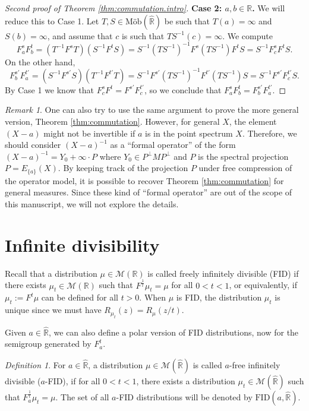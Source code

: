 \documentclass[reqno,11pt]{amsart}
\theoremstyle{remark}
\newtheorem{remark}[theorem]{Remark}
\newtheorem{definition}[theorem]{Definition}
\newcommand{\rr}{\mathbb{R}}
\newcommand{\MM}{\mathcal{M}}
\newcommand{\freepower}[1]{F^{#1}}
\newcommand{\pfreepower}[2]{F_{#1}^{#2}}
\newcommand{\mobr}{\text{Möb}(\hat{\rr})}
\begin{document}
\begin{proof}[Second proof of Theorem \ref{thm:commutation.intro}]
\textbf{Case 2: $a,b\in \rr$.} We will reduce this to Case 1. Let $T,S\in\mobr$ be such that $T(a)=\infty$ and $S(b)=\infty$, and assume that $c$ is such that $ TS^{-1} (c)=\infty$.  We compute
$$ \pfreepower{a}{s} \pfreepower{b}{t}= (T^{-1} \freepower{s} T )(S^{-1} \freepower{t}S) = S^{-1} (TS^{-1})^{-1} \freepower{s} (TS^{-1})\freepower{t} S= S^{-1} \pfreepower{c}{s}\freepower{t}S. $$
On the other hand,
$$\pfreepower{b}{s'}\pfreepower{a}{t'}=(S^{-1}\freepower{s'}S)(T^{-1} \freepower{t'} T )=S^{-1}\freepower{s'}(TS^{-1})^{-1} \freepower{t'} (TS^{-1})S= S^{-1} \freepower{s'}\pfreepower{c}{t'}S.$$
By Case 1 we know that $\pfreepower{c}{s}\freepower{t}=\freepower{s'}\pfreepower{c}{t'}$, so we conclude that $ \pfreepower{a}{s} \pfreepower{b}{t}= \pfreepower{b}{s'}\pfreepower{a}{t'}$.
\end{proof}

\begin{remark}
    One can also try to use the same argument to prove the more general version, Theorem \ref{thm:commutation}. However, for general $X$, the element $(X-a)$ might not be invertible if $a$ is in the point spectrum $X$. Therefore, we should consider $ (X-a)^{-1} $ as a ``formal operator'' of the form $(X-a)^{-1}= Y_0+\infty\cdot P$ where $Y_0 \in P^\perp MP^\perp$ and $ P $ is the spectral projection $P = E_{\{a\}}(X)$. By keeping track of the projection $P$ under free compression of the operator model, it is possible to recover Theorem \ref{thm:commutation} for general measures. Since these kind of ``formal operator'' are out of the scope of this manuscript, we will not explore the details.
\end{remark}



\section{Infinite divisibility}\label{sec:infdivisibility}
Recall that a distribution $\mu\in \MM(\rr)$ is called freely infinitely divisible (FID) if there exists $ \mu_t \in  \MM(\rr) $ such that $ \freepower{\frac{1}{t}}\mu_t = \mu $ for all $0<t<1$, or equivalently, if $\mu_t:= \freepower{t}\mu$ can be defined for all $t>0$. When $\mu$ is FID, the distribution $ \mu_t $ is unique since we must have $ R_{\mu_t}(z)=R_\mu(z/t) $.


Given $a\in \hat{\rr}$, we can also define a polar version of FID distributions, now for the semigroup generated by $\pfreepower{a}{t}$.
\begin{definition}
For $a\in \hat{\rr}$, a distribution $\mu\in \MM(\hat{\rr})$ is called $a$-free infinitely divisible ($a$-FID), if for all $0<t<1$, there exists a distribution $ \mu_t \in  \MM(\hat{\rr}) $ such that $ \pfreepower{a}{\frac{1}{t}}\mu_t = \mu $.  The set of all $a$-FID distributions will be denoted by $\text{FID}(a,\hat{\rr})$.
\end{definition}
\end{document}
